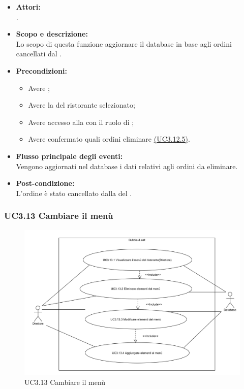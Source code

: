 \begin{itemize}
	\item \textbf{Attori:}
	\\.
	\item \textbf{Scopo e descrizione:} 
	\\Lo scopo di questa funzione aggiornare il database in base agli ordini cancellati dal .
	\item \textbf{Precondizioni:}
	\begin{itemize}
		\item Avere ;
		\item Avere la  del ristorante selezionato;
		\item Avere accesso alla  con il ruolo di ;
		\item Avere confermato quali ordini eliminare \hyperref[UC3.12.5]{(UC3.12.5)}.
	\end{itemize}
	\item \textbf{Flusso principale degli eventi:}
	\\Vengono aggiornati nel database i dati relativi agli ordini da eliminare.
	\item \textbf{Post-condizione:}
	\\L'ordine è stato cancellato dalla  del .
\end{itemize}

\subsubsection{UC3.13 Cambiare il menù} \label{UC3.13}

\begin{figure}[H]
	\centering
	\includegraphics[width=15cm]{../../documenti/AnalisiDeiRequisiti/Diagrammi_img/uc3_13.png}
	\caption{UC3.13 Cambiare il menù}
\end{figure}


